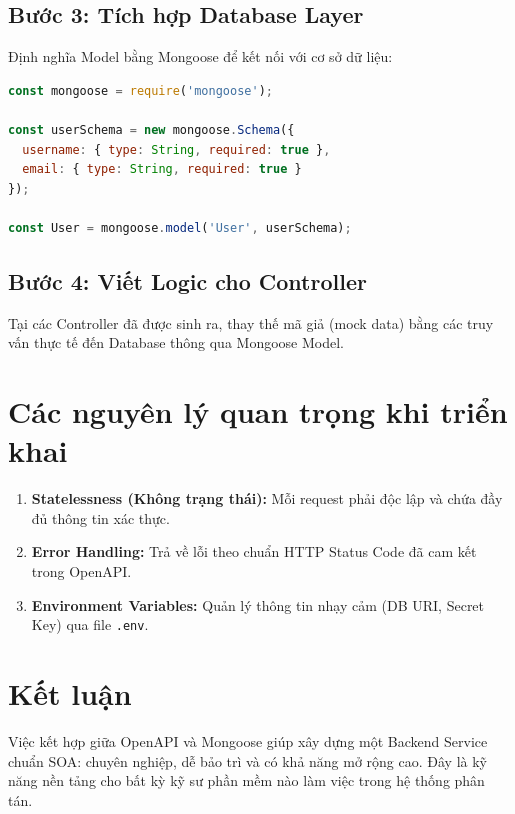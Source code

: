 \documentclass[12pt,a4paper]{article}
\begin{document}
\subsection{Bước 3: Tích hợp Database Layer}
Định nghĩa Model bằng Mongoose để kết nối với cơ sở dữ liệu:
\begin{lstlisting}[language=javascript, caption=Ví dụ kết nối Mongoose]
const mongoose = require('mongoose');

const userSchema = new mongoose.Schema({
  username: { type: String, required: true },
  email: { type: String, required: true }
});

const User = mongoose.model('User', userSchema);
\end{lstlisting}

\subsection{Bước 4: Viết Logic cho Controller}
Tại các Controller đã được sinh ra, thay thế mã giả (mock data) bằng các truy vấn thực tế đến Database thông qua Mongoose Model.

\section{Các nguyên lý quan trọng khi triển khai}
\begin{enumerate}
    \item \textbf{Statelessness (Không trạng thái):} Mỗi request phải độc lập và chứa đầy đủ thông tin xác thực.
    \item \textbf{Error Handling:} Trả về lỗi theo chuẩn HTTP Status Code đã cam kết trong OpenAPI.
    \item \textbf{Environment Variables:} Quản lý thông tin nhạy cảm (DB URI, Secret Key) qua file \texttt{.env}.
\end{enumerate}

\section{Kết luận}
Việc kết hợp giữa OpenAPI và Mongoose giúp xây dựng một Backend Service chuẩn SOA: chuyên nghiệp, dễ bảo trì và có khả năng mở rộng cao. Đây là kỹ năng nền tảng cho bất kỳ kỹ sư phần mềm nào làm việc trong hệ thống phân tán.
\end{document}
